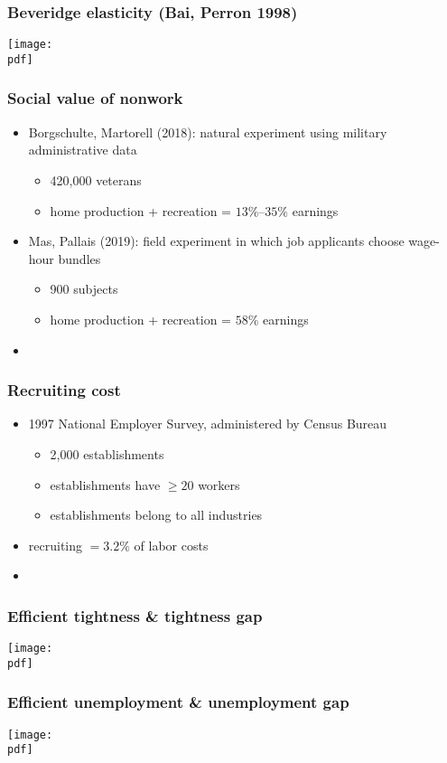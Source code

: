 \documentclass[12pt,xcolor={dvipsnames},hyperref={pdftex,pdfpagemode=UseNone,hidelinks,pdfdisplaydoctitle=true},usepdftitle=false]{beamer}
\def\pdf{xgap.pdf}
\begin{document}
\begin{frame}
\frametitle{Beveridge elasticity (Bai, Perron 1998) }
\texttt{[image: \\pdf]}%
\end{frame}

\begin{frame}
\frametitle{Social value of nonwork}
\begin{itemize}
\item Borgschulte, Martorell (2018): natural experiment using military administrative data
\begin{itemize}
\item 420,000 veterans
\item home production + recreation = $13\%$--$35\%$ earnings
\end{itemize}
\item Mas, Pallais (2019): field experiment in which job applicants choose wage-hour bundles
\begin{itemize}
\item 900 subjects
\item home production + recreation = $58\%$ earnings
\end{itemize}
\item[\then] 
\end{itemize}
\end{frame}

\begin{frame}
\frametitle{Recruiting cost}
\begin{itemize}
\item 1997 National Employer Survey, administered by Census Bureau
\begin{itemize}
	\item 2,000 establishments
	\item establishments have $\geq 20$ workers 
	\item establishments belong to all industries
\end{itemize}
\item recruiting $= 3.2\%$ of labor costs 
\item[\then] 
\end{itemize}
\end{frame}

\begin{frame}
\frametitle{Efficient tightness \& tightness gap}
\texttt{[image: \\pdf]}
\end{frame}

\begin{frame}
\frametitle{Efficient unemployment \& unemployment gap}
\texttt{[image: \\pdf]}
\end{frame}
\end{document}
